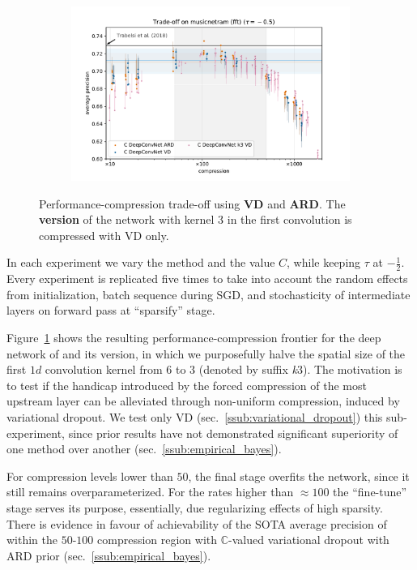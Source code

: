 \documentclass[a4paper,10pt]{article}
\newcommand{\cplx}{\mathbb{C}}
\begin{document}
\begin{figure}[!h]
  \centering
  \begin{subfigure}[b]{1.\textwidth}  %
    \centering
    \includegraphics[width=\columnwidth]{figure__musicnet__trade-off/paper__musicnetram__fft__-0.5.pdf}
  \end{subfigure}
  \caption{%
    Performance-compression trade-off using \textbf{\color{blue} VD} and \textbf{\color{orange} ARD}.
    The \textbf{\color{pink} version} of the network with kernel $3$ in the first convolution is
    compressed with VD only.
  }
  \label{fig:musicnet__trade-off}
\end{figure}

In each experiment we vary the method and the value $C$, while keeping $\tau$ at $-\tfrac12$.
Every experiment is replicated five times to take into account the random effects from
initialization, batch sequence during SGD, and stochasticity of intermediate layers on
forward pass at ``sparsify'' stage.

Figure~\ref{fig:musicnet__trade-off} shows the resulting performance-compression frontier
for the deep network of \citet{trabelsi_deep_2017} and its version, in which we purposefully
halve the spatial size of the first $1d$ convolution kernel from $6$ to $3$ (denoted by
suffix \textit{k}$3$). The motivation is to test if the handicap introduced by the forced
compression of the most upstream layer can be alleviated through non-uniform compression,
induced by variational dropout. We test only VD (sec.~\ref{ssub:variational_dropout}) this
sub-experiment, since prior results have not demonstrated significant superiority of one method
over another (sec.~\ref{ssub:empirical_bayes}).

For compression levels lower than $50$, the final stage overfits the network, since it still
remains overparameterized. For the rates higher than $\approx 100$ the ``fine-tune'' stage
serves its purpose, essentially, due regularizing effects of high sparsity. There is evidence
in favour of achievability of the SOTA average precision of \citet{trabelsi_deep_2017} within
the $50$-$100$ compression region with $\cplx$-valued variational dropout with ARD prior
(sec.~\ref{ssub:empirical_bayes}).
\end{document}
